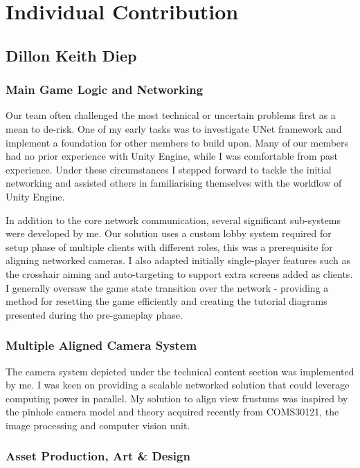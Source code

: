 \documentclass[a4paper,11pt]{article}
\begin{document}
\clearpage

\section{Individual Contribution}

\subsection{Dillon Keith Diep}

\subsubsection{Main Game Logic and Networking}

Our team often challenged the most technical or uncertain problems first as a mean to de-risk. One of my early tasks was to investigate UNet framework and implement a foundation for other members to build upon. Many of our members had no prior experience with Unity Engine, while I was comfortable from past experience. Under these circumstances I stepped forward to tackle the initial networking and assisted others in familiarising themselves with the workflow of Unity Engine.

In addition to the core network communication, several significant sub-systems were developed by me. Our solution uses a custom lobby system required for setup phase of multiple clients with different roles, this was a prerequisite for aligning networked cameras. I also adapted initially single-player features such as the crosshair aiming and auto-targeting to support extra screens added as clients. I generally oversaw the game state transition over the network - providing a method for resetting the game efficiently and creating the tutorial diagrams presented during the pre-gameplay phase.

\subsubsection{Multiple Aligned Camera System}

The camera system depicted under the technical content section was implemented by me. I was keen on providing a scalable networked solution that could leverage computing power in parallel.  My solution to align view frustums was inspired by the pinhole camera model and theory acquired recently from COMS30121, the image processing and computer vision unit.

\subsubsection{Asset Production, Art \& Design}
\end{document}
